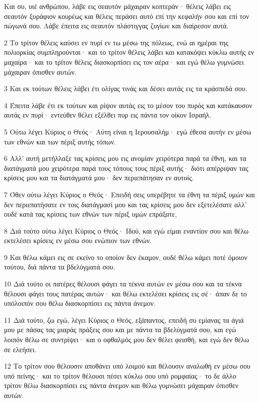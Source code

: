 \par Και συ, υιέ ανθρώπου, λάβε εις σεαυτόν μάχαιραν κοπτεράν· θέλεις λάβει εις σεαυτόν ξυράφιον κουρέως και θέλεις περάσει αυτό επί την κεφαλήν σου και επί τον πώγωνά σου. Λάβε έπειτα εις σεαυτόν πλάστιγγας ζυγίων και διαίρεσον αυτά.
\par 2 Το τρίτον θέλεις καύσει εν πυρί εν τω μέσω της πόλεως, ενώ αι ημέραι της πολιορκίας συμπληρούνται· και το τρίτον θέλεις λάβει και κατακόψει κύκλω αυτής εν μαχαίρα· και το τρίτον θέλεις διασκορπίσει εις τον αέρα· και εγώ θέλω γυμνώσει μάχαιραν όπισθεν αυτών.
\par 3 Και εκ τούτων θέλεις λάβει έτι ολίγας τινάς και δέσει αυτάς εις τα κράσπεδά σου.
\par 4 Έπειτα λάβε έτι εκ τούτων και ρίψον αυτάς εις το μέσον του πυρός και κατάκαυσον αυτάς εν πυρί· εντεύθεν θέλει εξέλθει πυρ εις πάντα τον οίκον Ισραήλ.
\par 5 Ούτω λέγει Κύριος ο Θεός· Αύτη είναι η Ιερουσαλήμ· εγώ έθεσα αυτήν εν μέσω των εθνών και των πέριξ αυτής τόπων.
\par 6 Αλλ' αυτή μετήλλαξε τας κρίσεις μου εις ανομίαν χειρότερα παρά τα έθνη, και τα διατάγματά μου χειρότερα παρά τους τόπους τους πέριξ αυτής· διότι απέρριψαν τας κρίσεις μου και τα διατάγματά μου· δεν περιεπάτησαν εν αυτοίς.
\par 7 Όθεν ούτω λέγει Κύριος ο Θεός· Επειδή σεις υπερέβητε τα έθνη τα πέριξ υμών και δεν περιεπατήσατε εν τοις διατάγμασί μου και τας κρίσεις μου δεν εξετελέσατε αλλ' ουδέ κατά τας κρίσεις των εθνών των πέριξ υμών επράξατε,
\par 8 Διά τούτο ούτω λέγει Κύριος ο Θεός· Ιδού, και εγώ είμαι εναντίον σου και θέλω εκτελέσει κρίσεις εν μέσω σου ενώπιον των εθνών.
\par 9 Και θέλω κάμει εις σε εκείνο το οποίον δεν έκαμον, ουδέ θέλω κάμει ποτέ όμοιον τούτου, διά πάντα τα βδελύγματά σου.
\par 10 Διά τούτο οι πατέρες θέλουσι φάγει τα τέκνα αυτών εν μέσω σου και τα τέκνα θέλουσι φάγει τους πατέρας αυτών· και θέλω εκτελέσει κρίσεις εις σέ· άπαν δε το υπόλοιπόν σου θέλω διασκορπίσει εις πάντα άνεμον.
\par 11 Διά τούτο, ζω εγώ, λέγει Κύριος ο Θεός, εξάπαντος, επειδή συ εμίανας τα άγιά μου με πάσας τας μιαράς πράξεις σου και με πάντα τα βδελύγματά σου, και εγώ λοιπόν θέλω σε συντρίψει· και ο οφθαλμός μου δεν θέλει φεισθή, και εγώ δεν θέλω σε ελεήσει.
\par 12 Το τρίτον σου θέλουσιν αποθάνει υπό λοιμού και θέλουσιν αναλωθή εν μέσω σου υπό πείνης· και το τρίτον θέλουσι πέσει κύκλω σου υπό ρομφαίας· το δε άλλο τρίτον θέλω διασκορπίσει εις πάντα άνεμον και θέλω γυμνώσει μάχαιραν όπισθεν αυτών.
